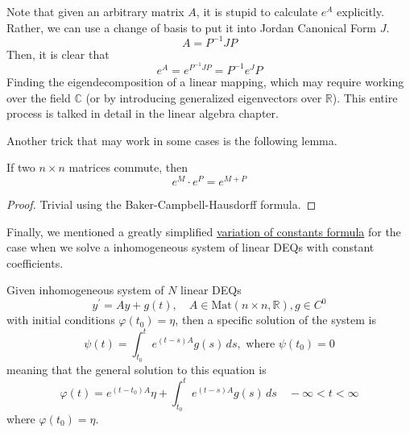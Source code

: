 \documentclass{article}
\begin{document}
    Note that given an arbitrary matrix $A$, it is stupid to calculate $e^{A}$ explicitly. Rather, we can use a change of basis to put it into Jordan Canonical Form $J$. 
    \begin{equation}
      A = P^{-1} J P
    \end{equation}
    Then, it is clear that
    \begin{equation}
      e^A = e^{P^{-1} J P} = P^{-1} e^J P
    \end{equation}
    Finding the eigendecomposition of a linear mapping, which may require working over the field $\mathbb{C}$ (or by introducing generalized eigenvectors over $\mathbb{R}$). This entire process is talked in detail in the linear algebra chapter. 

    Another trick that may work in some cases is the following lemma. 

    \begin{lemma}
      \label{thm:exponential-of-commuting-matrices}
    If two $n \times n$ matrices commute, then
    \begin{equation}
      e^{M} \cdot e^{P} = e^{M + P}
    \end{equation}
    \end{lemma}
    \begin{proof}
    Trivial using the Baker-Campbell-Hausdorff formula. 
    \end{proof}

    Finally, we mentioned a greatly simplified \hyperref[thm:variation-of-constants-formula]{variation of constants formula} for the case when we solve a inhomogeneous system of linear DEQs with constant coefficients. 

    \begin{corollary}
      \label{thm:multivariate-variation-of-constants-formula-for}
    Given inhomogeneous system of $N$ linear DEQs 
    \begin{equation}
      y^\prime = A y + g(t), \quad A \in \text{Mat}(n \times n, \mathbb{R}), g \in C^0
    \end{equation}
    with initial conditions $\varphi(t_0) = \eta$, then a specific solution of the system is 
    \begin{equation}
      \psi (t) = \int_{t_0}^t e^{(t-s)A} g(s) \,ds , \text{ where } \psi(t_0) = 0
    \end{equation}
    meaning that the general solution to this equation is 
    \begin{equation}
      \varphi(t) = e^{(t - t_0)A} \eta + \int_{t_0}^t e^{(t-s)A} g(s) \,ds \quad -\infty < t< \infty
    \end{equation}
    where $\varphi(t_0) = \eta$. 
    \end{corollary}
\end{document}
